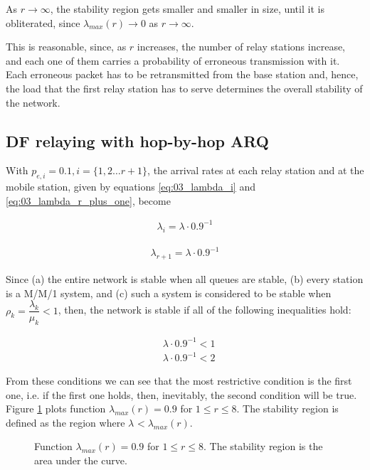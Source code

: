 As $r \to \infty$, the stability region gets smaller and smaller in size, until
it is obliterated, since $\lambda_{max}(r) \to 0$ as $r \to \infty$.

This is reasonable, since, as $r$ increases, the number of relay stations
increase, and each one of them carries a probability of erroneous transmission
with it. Each erroneous packet has to be retransmitted from the base station
and, hence, the load that the first relay station has to serve determines the
overall stability of the network.


\subsection{DF relaying with hop-by-hop ARQ}

With $p_{e,i} = 0.1, i = \{1,2 \dots r+1\}$, the arrival rates at each relay
station and at the mobile station, given by equations \ref{eq:03_lambda_i}
and \ref{eq:03_lambda_r_plus_one}, become

\begin{align}
  \lambda_i = \lambda \cdot 0.9^{-1}
  \label{eq:04_stability_region_df_hbh_lambda_i}
\end{align}

\begin{align}
  \lambda_{r+1} = \lambda \cdot 0.9^{-1}
  \label{eq:04_stability_region_df_hbh_lambda_r_plus_one}
\end{align}

Since (a) the entire network is stable when all queues are stable, (b) every
station is a M/M/1 system, and (c) such a system is considered to be stable
when $\rho_k = \dfrac{\lambda_k}{\mu_k} < 1$, then, the network is stable if all
of the following inequalities hold:

\begin{align*}
  &\lambda \cdot 0.9^{-1} < 1 \\
  &\lambda \cdot 0.9^{-1} < 2
\end{align*}

From these conditions  we can see that the most restrictive condition is the
first one, i.e. if the first one holds, then, inevitably, the second condition
will be true. Figure \ref{fig:04_stability_region_df_hbh} plots function
$\lambda_{max}(r) = 0.9$ for $1 \leq r \leq 8$. The stability
region is defined as the region where $\lambda_{} < \lambda_{max}(r)$.

\begin{figure}[H]\centering
  
  \caption{Function $\lambda_{max}(r) = 0.9$ for $1 \leq r \leq 8$.
    The stability region is the area under the curve.}
  \label{fig:04_stability_region_df_hbh}
\end{figure}

